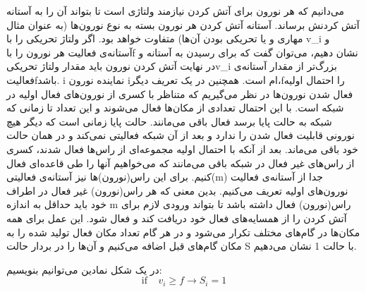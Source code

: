 می‌دانیم که هر نورون برای آتش کردن نیازمند ولتاژی  است  تا بتواند آن را به آستانه  آتش کردنش برساند.  آستانه آتش کردن هر نورون بسته به نوع نورون‌ها (به عنوان مثال مهاری و یا تحریکی بودن آن‌ها) متفاوت خواهد بود. اگر ولتاژ تحریکی را با v_{i} و آستانه‌ی فعالیت هر نورون را باf نشان دهیم، می‌توان گفت که برای رسیدن به آستانه و در نهایت آتش کردن نورون باید مقدار ولتاژ تحریکیv_{i} بزرگ‌تر از مقدار آستانه‌ی فعالیتfباشد. i نماینده نورون iام است. همچنین در یک تعریف دیگر،fرا احتمال اولیه فعال شدن نورون‌ها در نظر می‌گیریم که متناظر با کسری از نورون‌های فعال اولیه در شبکه است. با این احتمال تعدادی از مکان‌ها فعال می‌شوند و این تعداد تا زمانی‌ که شبکه به حالت پایا برسد فعال باقی ‌می‌مانند. حالت پایا زمانی‌ است که دیگر هیچ نورونی قابلیت فعال شدن را ندارد  و بعد از آن شبکه فعالیتی نمی‌کند و در همان حالت خود باقی می‌ماند. بعد از آنکه با احتمال اولیه مجموعه‌ای از راس‌ها فعال شدند، کسری از راس‌های غیر فعال در شبکه باقی می‌مانند که می‌خواهیم آنها را طی قاعده‌ای فعال کنیم. برای این راس(نورون)‌ها نیز آستانه‌ی فعالیتی(m) جدا از آستانه‌ی فعالیت نورون‌های اولیه تعریف می‌کنیم. بدین معنی که هر راس(نورون)‌ غیر فعال در اطراف خود باید حداقل به اندازه m راس(نورون) فعال داشته باشد تا بتواند ورودی لازم برای آتش کردن را از همسایه‌های فعال خود دریافت کند و فعال شود. این عمل برای همه مکان‌ها در گام‌های مختلف تکرار می‌شود و در هر گام تعداد مکان فعال تولید شده  را به مکان‌ گام‌های قبل اضافه می‌کنیم و آن‌ها را در بردار حالت S با حالت 1 نشان می‌دهیم.

در یک شکل نمادین می‌توانیم بنویسیم: 
\begin{equation}
\text{if}~~~~~v_{i}\geq f \longrightarrow S_{i} = 1
\end{equation}


